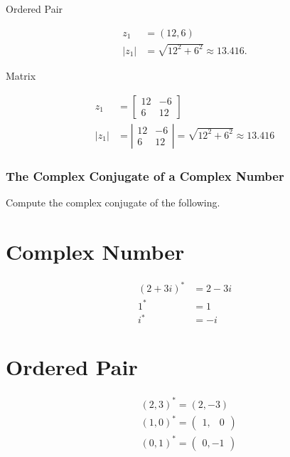 Ordered Pair

$$
\begin{aligned}
z_{1} & =(12,6) \\
\left|z_{1}\right| & =\sqrt{12^{2}+6^{2}} \approx 13.416 .
\end{aligned}
$$

Matrix

$$
\begin{aligned}
z_{1} & =\left[\begin{array}{cc}
12 & -6 \\
6 & 12
\end{array}\right] \\
\left|z_{1}\right| & =\left|\begin{array}{cc}
12 & -6 \\
6 & 12
\end{array}\right|=\sqrt{12^{2}+6^{2}} \approx 13.416
\end{aligned}
$$

\subsubsection{The Complex Conjugate of a Complex Number}
Compute the complex conjugate of the following.

\section{Complex Number}
$$
\begin{aligned}
(2+3 i)^{*} & =2-3 i \\
1^{*} & =1 \\
i^{*} & =-i
\end{aligned}
$$

\section{Ordered Pair}
$$
\begin{aligned}
& (2,3)^{*}=(2,-3) \\
& (1,0)^{*}=\left(\begin{array}{ll}
1, & 0
\end{array}\right) \\
& (0,1)^{*}=\left(\begin{array}{ll}
0,-1
\end{array}\right)
\end{aligned}
$$

